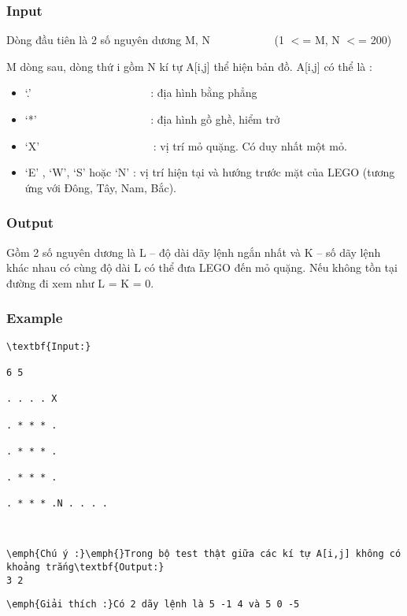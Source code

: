 \subsubsection{   Input  }

\textbf{}   Dòng đầu tiên là 2 số nguyên dương M, N            (1 $<$= M, N $<$= 200)  

   M dòng sau, dòng thứ i gồm N kí tự A[i,j] thể hiện bản đồ. A[i,j] có thể là :  
\begin{itemize}
	\item     ‘.’                          : địa hình bằng phẳng   
	\item     ‘*’                         : địa hình gồ ghề, hiểm trở   
	\item     ‘X’                         : vị trí mỏ quặng. Có duy nhất một mỏ.   
	\item     ‘E’ , ‘W’, ‘S’ hoặc ‘N’ : vị trí hiện tại và hướng trước mặt của LEGO (tương ứng với Đông, Tây, Nam, Bắc).   
\end{itemize}

\subsubsection{   Output  }

\textbf{}   Gồm 2 số nguyên dương là L – độ dài dãy lệnh ngắn nhất và K – số dãy lệnh khác nhau có cùng độ dài L có thể đưa LEGO đến mỏ quặng. Nếu không tồn tại đường đi xem như L = K = 0.  

\subsubsection{   Example  }
\begin{verbatim}
\textbf{Input:}

6 5

. . . . X

. * * * .

. * * * .

. * * * .

. * * * .N . . . .\end{verbatim}
\begin{verbatim}


\emph{Chú ý :}\emph{}Trong bộ test thật giữa các kí tự A[i,j] không có khoảng trắng\textbf{Output:}
3 2\end{verbatim}
\begin{verbatim}
\emph{Giải thích :}Có 2 dãy lệnh là 5 -1 4 và 5 0 -5\end{verbatim}